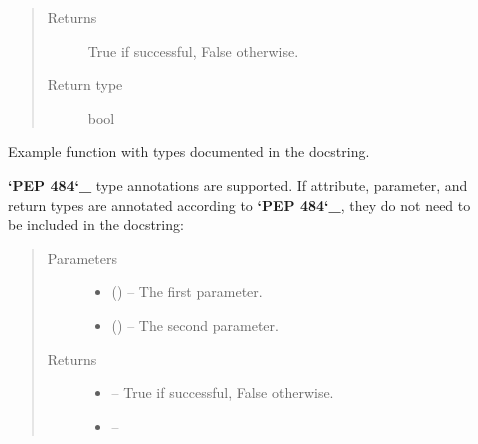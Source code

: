 \documentclass[letterpaper,10pt,english]{sphinxmanual}
\begin{document}
\begin{description}
\begin{fulllineitems}
\begin{quote}
\begin{description}
\begin{itemize}
\end{itemize}

\item[{Returns}] \leavevmode
True if successful, False otherwise.

\item[{Return type}] \leavevmode
bool

\end{description}\end{quote}

\end{fulllineitems}


\begin{fulllineitems}
\label{\detokenize{autogen:example_docstring.function_with_types_in_docstring}}
Example function with types documented in the docstring.

{\color{red}\bfseries{}`PEP 484`\_} type annotations are supported. If attribute, parameter, and
return types are annotated according to {\color{red}\bfseries{}`PEP 484`\_}, they do not need to be
included in the docstring:
\begin{quote}\begin{description}
\item[{Parameters}] \leavevmode\begin{itemize}
\item {} 
 () – The first parameter.

\item {} 
 () – The second parameter.

\end{itemize}

\item[{Returns}] \leavevmode
\begin{itemize}
\item {} 
 – True if successful, False otherwise.

\item {} 
 – 


\end{itemize}
\end{description}
\end{quote}
\end{fulllineitems}
\end{description}
\end{document}
